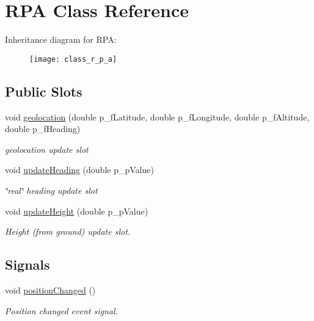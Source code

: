 \hypertarget{class_r_p_a}{\section{R\-P\-A Class Reference}
\label{class_r_p_a}
}
Inheritance diagram for R\-P\-A\-:\begin{figure}[H]
\begin{center}
\leavevmode
\texttt{[image: class\_r\_p\_a]}
\end{center}
\end{figure}
\subsection*{Public Slots}
\begin{DoxyCompactItemize}
\item 
void \hyperlink{class_r_p_a_a052d26b0c708605a67dc0cf28d8dbaa6}{geolocation} (double p\-\_\-f\-Latitude, double p\-\_\-f\-Longitude, double p\-\_\-f\-Altitude, double p\-\_\-f\-Heading)
\begin{DoxyCompactList}\small\item\em geolocation update slot \end{DoxyCompactList}\item 
void \hyperlink{class_r_p_a_a98e370d18f106541c5d7e8b52ca30a40}{update\-Heading} (double p\-\_\-p\-Value)
\begin{DoxyCompactList}\small\item\em \char`\"{}real\char`\"{} heading update slot \end{DoxyCompactList}\item 
void \hyperlink{class_r_p_a_a656bbe49cdcc2ee8cbb1ca1798a3744f}{update\-Height} (double p\-\_\-p\-Value)
\begin{DoxyCompactList}\small\item\em Height (from ground) update slot. \end{DoxyCompactList}\end{DoxyCompactItemize}
\subsection*{Signals}
\begin{DoxyCompactItemize}
\item 
void \hyperlink{class_r_p_a_abaf5cad6fd34a323051ab6f2d03d29f9}{position\-Changed} ()
\begin{DoxyCompactList}\small\item\em Position changed event signal. \end{DoxyCompactList}\end{DoxyCompactItemize}
